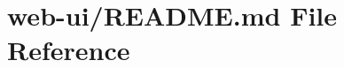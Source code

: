 \hypertarget{web-ui_2_r_e_a_d_m_e_8md}{}\section{web-\/ui/\+R\+E\+A\+D\+ME.md File Reference}
\label{web-ui_2_r_e_a_d_m_e_8md}
